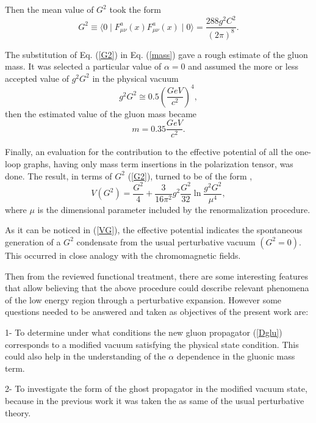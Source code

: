 \documentclass[12pt,letterpaper]{report}
\begin{document}
Then the mean value of $G^2$ took the form
\begin{equation}
G^2\equiv \langle 0\mid F_{\mu \nu }^a\left(x\right) F_{\mu \nu
}^a\left(x\right) \mid 0\rangle =\frac{288g^2C^2}{\left(2\pi
\right) ^8}. \label{G2}
\end{equation}

The substitution of Eq. (\ref{G2}) in Eq. (\ref{mass}) gave a
rough estimate of the gluon mass. It was selected a particular
value of $\alpha =0$ and assumed the more or less accepted value
of $g^2G^2$ in the physical vacuum
\begin{equation}
g^2G^2\cong 0.5\left(\frac{GeV}{c^2}\right) ^4,
\end{equation}
then the estimated value of the gluon mass became
\begin{equation}
m=0.35\frac{GeV}{c^2}.
\end{equation}

Finally, an evaluation for the contribution to the effective
potential of all the one-loop graphs, having only mass term
insertions in the polarization tensor, was done. The result, in
terms of $G^2$ (\ref{G2}), turned to be of the form \cite{Cabo},
\begin{equation}
V\left(G^2\right) =\frac{G^2}4+\frac 3{16\pi
^2}g^2\frac{G^2}{32}\ln \frac{ g^2G^2}{\mu ^4}, \label{VG}
\end{equation}
where $\mu $ is the dimensional parameter included by the
renormalization procedure.

As it can be noticed in (\ref{VG}), the effective potential
indicates the spontaneous generation of a $G^2$ condensate from
the usual perturbative vacuum $\left(G^2=0\right) $. This occurred
in close analogy with the chromomagnetic fields.

Then from the reviewed functional treatment, there are some
interesting features that allow believing that the above procedure
could describe relevant phenomena of the low energy region through
a perturbative expansion. However some questions needed to be
answered and taken as objectives of the present work are:

1- To determine under what conditions the new gluon propagator
(\ref{Dglu}) corresponds to a modified vacuum satisfying the
physical state condition. This could also help in the
understanding of the $\alpha$ dependence in the gluonic mass term.

2- To investigate the form of the ghost propagator in the modified
vacuum state, because in the previous work \cite{Cabo} it was
taken the as same of the usual perturbative theory.
\end{document}
